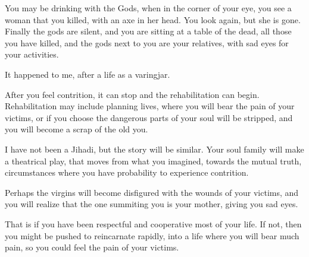 You may be drinking with the Gods, when in the corner of your eye, you see a
woman that you killed, with an axe in her head. You look again, but she is gone.
Finally the gods are silent, and you are sitting at a table of the dead, all
those you have killed, and the gods next to you are your relatives, with sad 
eyes for your activities.

It happened to me, after a life as a varingjar. 

After you feel contrition, it can stop and the rehabilitation can begin.
Rehabilitation may include planning lives, where you will bear the pain of your
victims, or if you choose the dangerous parts of your soul will be stripped, and
you will become a scrap of the old you.\cite{newton2000destiny}

I have not been a Jihadi, but the story will be similar. Your soul family will
make a theatrical play, that moves from what you imagined, towards the mutual
truth, circumstances where you have probability to experience contrition.

Perhaps the virgins will become disfigured with the wounds of your victims, and
you will realize that the one summiting you is your mother, giving you sad eyes.

That is if you have been respectful and cooperative most of your life. 
If not, then you might be pushed to reincarnate rapidly, into a life where you
will bear much pain, so you could feel the pain of your
victims.\cite{newton1994journey}

